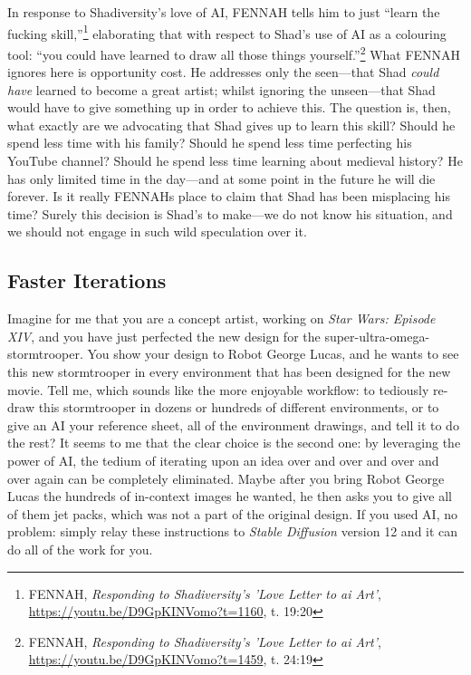 \documentclass[11pt]{article}
\begin{document}
In response to Shadiversity's love of AI, FENNAH tells him to just ``learn the fucking skill,''\footnote{FENNAH, \emph{Responding to Shadiversity's 'Love Letter to ai Art'}, \url{https://youtu.be/D9GpKINVomo?t=1160}, t. 19:20} elaborating that with respect to Shad's use of AI as a colouring tool: ``you could have learned to draw all those things yourself.''\footnote{FENNAH, \emph{Responding to Shadiversity's 'Love Letter to ai Art'}, \url{https://youtu.be/D9GpKINVomo?t=1459}, t. 24:19} What FENNAH ignores here is opportunity cost. He addresses only the seen---that Shad \emph{could have} learned to become a great artist; whilst ignoring the unseen---that Shad would have to give something up in order to achieve this. The question is, then, what exactly are we advocating that Shad gives up to learn this skill? Should he spend less time with his family? Should he spend less time perfecting his YouTube channel? Should he spend less time learning about medieval history? He has only limited time in the day---and at some point in the future he will die forever. Is it really FENNAHs place to claim that Shad has been misplacing his time? Surely this decision is Shad's to make---we do not know his situation, and we should not engage in such wild speculation over it.

\subsection*{Faster Iterations}
\label{sec:orgeedc76a}
Imagine for me that you are a concept artist, working on \emph{Star Wars: Episode XIV}, and you have just perfected the new design for the super-ultra-omega-stormtrooper. You show your design to Robot George Lucas, and he wants to see this new stormtrooper in every environment that has been designed for the new movie. Tell me, which sounds like the more enjoyable workflow: to tediously re-draw this stormtrooper in dozens or hundreds of different environments, or to give an AI your reference sheet, all of the environment drawings, and tell it to do the rest? It seems to me that the clear choice is the second one: by leveraging the power of AI, the tedium of iterating upon an idea over and over and over and over again can be completely eliminated. Maybe after you bring Robot George Lucas the hundreds of in-context images he wanted, he then asks you to give all of them jet packs, which was not a part of the original design. If you used AI, no problem: simply relay these instructions to \emph{Stable Diffusion} version 12 and it can do all of the work for you.
\end{document}
